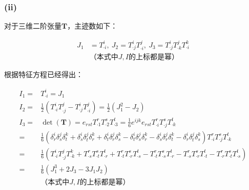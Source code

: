 \documentclass[UTF8,zihao=5]{ctexart}
\newcommand{\bm}[1]{{\mathbf{#1}}}
\begin{document}
\subsubsection*{(ii)}
对于三维二阶张量$\bm{T}$，主迹数如下：

\begin{equation}
    \begin{aligned}
        J_1 & =T^i_{\cdot i},\
        J_2=T^i_{\cdot j}T^j_{\cdot i},\
        J_3=T^i_{\cdot j}T^j_{\cdot k}T^k_{\cdot i} \\
            & \text{（本式中$J,I$的上标都是幂）}
    \end{aligned}
\end{equation}

根据特征方程已经得出：

\begin{equation}
    \begin{aligned}
        I_1= & T^i_{\cdot i}=J_1                                            \\
        I_2= & \frac{1}{2}\left(T^i_{\cdot i}T^j_{\cdot j}
        -T^i_{\cdot j}T^j_{\cdot i}\right)
        =\frac{1}{2}(J_1^2-J_2)                                             \\
        I_3= & \det(\bm{T})=e_{rst}T^r_{\cdot 1}T^s_{\cdot 2}T^t_{\cdot 3}=
        \frac{1}{6}e^{ijk}e_{rst}T^r_{\cdot i}T^s_{\cdot j}T^t_{\cdot k}    \\
        =    &
        \frac{1}{6}
        \left(\delta^i_r\delta^j_s\delta^k_t +
        \delta^i_s\delta^j_t\delta^k_r +
        \delta^i_t\delta^j_r\delta^k_s -
        \delta^i_t\delta^j_s\delta^k_r -
        \delta^i_s\delta^j_r\delta^k_t -
        \delta^i_r\delta^j_t\delta^k_s\right)
        T^r_{\cdot i}T^s_{\cdot j}T^t_{\cdot k}                             \\
        =    &
        \frac{1}{6}
        \left(
        T^i_{\cdot i}T^j_{\cdot j}T^k_{\cdot k}+
        T^r_{\cdot s}T^s_{\cdot t}T^t_{\cdot r}+
        T^r_{\cdot t}T^s_{\cdot r}T^t_{\cdot s}-
        T^r_{\cdot t}T^s_{\cdot s}T^t_{\cdot r}-
        T^r_{\cdot s}T^s_{\cdot r}T^t_{\cdot t}-
        T^r_{\cdot r}T^s_{\cdot t}T^t_{\cdot s}
        \right)                                                             \\
        =    &
        \frac{1}{6}
        \left(
        J_1^3+2J_3-3J_1J_2
        \right)                                                             \\
             & \text{（本式中$J,I$的上标都是幂）}
    \end{aligned}
\end{equation}
\end{document}
